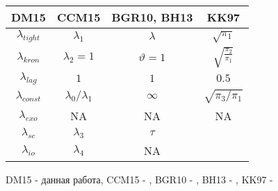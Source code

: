 \documentclass[11pt]{article} %
\begin{document}
\begin{center}
\begin{tabular}{cccc}
\toprule
DM15 &  CCM15 &  BGR10, BH13 & KK97  \\
\midrule
$\lambda_{tight}$ & $\lambda_1$ & $\lambda$ & $\sqrt{\pi_1}$ \\
$\lambda_{kron}$ & $\lambda_2=1$ & $\vartheta=1$ &  $\sqrt{\frac{\pi_2}{\pi_1}}$\\
$\lambda_{lag}$ & $1$ & $1$ & $0.5$\\
$\lambda_{const}$  & $\lambda_0/\lambda_1$ & $\infty$ &$ \sqrt{\pi_3/\pi_1}$\\
$\lambda_{exo}$ & NA & NA & NA\\
\midrule
$\lambda_{sc}$ & $\lambda_3$ & $\tau$ & \\
$\lambda_{io}$ & $\lambda_4$ & NA & \\
\bottomrule
\end{tabular}
\end{center}

DM15 - данная работа, CCM15 - \cite{carriero_al_2015}, BGR10 - \cite{banbura_al_2010}, BH13 - \cite{berg_henzel_2013}, KK97 - \cite{kadiyala_karlsson_1997}
\end{document}
